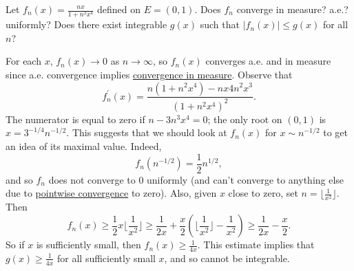   \begin{exercise}
    Let $f_{n}(x)=\frac{nx}{1+n^{2}x^{4}}$ defined on $E=(0,1)$. Does $f_{n}$ converge in measure? a.e.? uniformly? Does there exist integrable $g(x)$ such that $|f_{n}(x)|\le g(x)$ for all $n$?
  \end{exercise}
  \begin{solution}
    For each $x$, $f_{n}(x)\rightarrow0$ as $n\rightarrow\infty$, so $f_{n}(x)$ converges a.e. and in measure since a.e. convergence implies \hyperref[def:convergence-in-measure]{convergence in measure}. Observe that
    \begin{equation}
      f_{n}^{\prime}(x)=\frac{n(1+n^{2}x^{4})-nx4n^{2}x^{3}}{(1+n^{2}x^{4})^{2}}.
    \end{equation}
    The numerator is equal to zero if $n-3n^{3}x^{4}=0$; the only root on $(0,1)$ is $x=3^{-1/4}n^{-1/2}$. This suggests that we should look at $f_{n}(x)$ for $x\sim n^{-1/2}$ to get an idea of its maximal value. Indeed,
    \begin{equation}
      f_{n}(n^{-1/2})=\frac{1}{2}n^{1/2},
    \end{equation}
    and so $f_{n}$ does not converge to 0 uniformly (and can't converge to anything else due to \hyperref[real-def:pointwise-convergence]{pointwise convergence} to zero). Also, given $x$ close to zero, set $n=\lfloor\frac{1}{x^{2}}\rfloor$. Then
    \begin{equation}
      f_{n}(x)\ge\frac{1}{2}x\lfloor\frac{1}{x^{2}}\rfloor\ge\frac{1}{2x}+\frac{x}{2}(\lfloor\frac{1}{x^{2}}\rfloor-\frac{1}{x^{2}})\ge\frac{1}{2x}-\frac{x}{2}.
    \end{equation}
    So if $x$ is sufficiently small, then $f_{n}(x)\ge\frac{1}{4x}$. This estimate implies that $g(x)\ge\frac{1}{4x}$ for all sufficiently small $x$, and so cannot be integrable.
  \end{solution}

